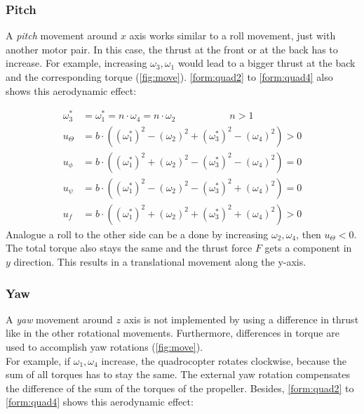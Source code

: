 \newpage

\subsubsection{Pitch}

A \emph{pitch} movement around $x$ axis works similar to a roll movement, 
just with another motor pair. 
In this case, the thrust at the front or at the back has to increase. 
For example, increasing $\omega_3, \omega_1$ would lead to a bigger thrust at the back 
and the corresponding torque (\cref{fig:move}). \cref{form:quad2} to \cref{form:quad4} also shows this aerodynamic effect:

\begin{align*}
	\omega_3^* &= \omega_1^* = n \cdot \omega_4 = n \cdot \omega_2 \qquad \qquad \quad \enspace  n > 1\\
	u_{\Theta} &= b \cdot ((\omega_1^*)^2 - (\omega_2)^2 + (\omega_3^*)^2 - (\omega_4)^2) > 0\\
	u_{\phi} &= b \cdot ((\omega_1^*)^2 + (\omega_2)^2 - (\omega_3^*)^2 - (\omega_4)^2) = 0 \\
	u_{\psi} &= b \cdot ((\omega_1^*)^2 - (\omega_2)^2 - (\omega_3^*)^2 + (\omega_4)^2)	= 0 \\
	u_f &= b \cdot ((\omega_1^*)^2 + (\omega_2)^2 + (\omega_3^*)^2 + (\omega_4)^2) > 0 
\end{align*}
\newline
Analogue a roll to the other side can be a done by increasing $\omega_2, \omega_4$, then $u_{\Theta} < 0$. 
The total torque also stays the same and the thrust force $F$ gets a component in $y$ direction. This results in a translational movement along the y-axis.


\subsubsection{Yaw}
A \emph{yaw} movement around $z$ axis is not implemented by using a difference in thrust like in the other rotational movements. 
Furthermore, differences in torque are used to accomplish yaw rotations (\cref{fig:move}). \\
For example, if $\omega_1, \omega_4$  increase, the quadrocopter rotates clockwise, 
because the sum of all torques has to stay the same. The external yaw rotation compensates the difference of the sum of the torques of the propeller. 
Besides, \cref{form:quad2} to \cref{form:quad4} shows this aerodynamic effect:

